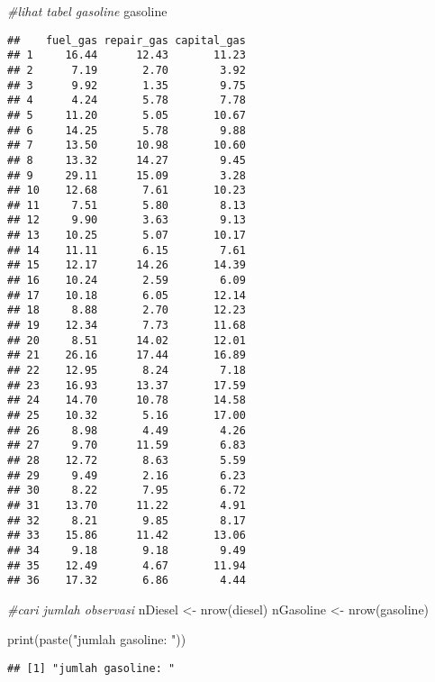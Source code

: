\documentclass[
]{article}
\newenvironment{Shaded}{\begin{snugshade}}{\end{snugshade}}
\newcommand{\CommentTok}[1]{\textcolor[rgb]{0.56,0.35,0.01}{\textit{#1}}}
\newcommand{\FunctionTok}[1]{\textcolor[rgb]{0.00,0.00,0.00}{#1}}
\newcommand{\NormalTok}[1]{#1}
\newcommand{\OtherTok}[1]{\textcolor[rgb]{0.56,0.35,0.01}{#1}}
\newcommand{\StringTok}[1]{\textcolor[rgb]{0.31,0.60,0.02}{#1}}
\begin{document}
\begin{Shaded}
\begin{Highlighting}[]
\CommentTok{\#lihat tabel gasoline}
\NormalTok{gasoline}
\end{Highlighting}
\end{Shaded}

\begin{verbatim}
##    fuel_gas repair_gas capital_gas
## 1     16.44      12.43       11.23
## 2      7.19       2.70        3.92
## 3      9.92       1.35        9.75
## 4      4.24       5.78        7.78
## 5     11.20       5.05       10.67
## 6     14.25       5.78        9.88
## 7     13.50      10.98       10.60
## 8     13.32      14.27        9.45
## 9     29.11      15.09        3.28
## 10    12.68       7.61       10.23
## 11     7.51       5.80        8.13
## 12     9.90       3.63        9.13
## 13    10.25       5.07       10.17
## 14    11.11       6.15        7.61
## 15    12.17      14.26       14.39
## 16    10.24       2.59        6.09
## 17    10.18       6.05       12.14
## 18     8.88       2.70       12.23
## 19    12.34       7.73       11.68
## 20     8.51      14.02       12.01
## 21    26.16      17.44       16.89
## 22    12.95       8.24        7.18
## 23    16.93      13.37       17.59
## 24    14.70      10.78       14.58
## 25    10.32       5.16       17.00
## 26     8.98       4.49        4.26
## 27     9.70      11.59        6.83
## 28    12.72       8.63        5.59
## 29     9.49       2.16        6.23
## 30     8.22       7.95        6.72
## 31    13.70      11.22        4.91
## 32     8.21       9.85        8.17
## 33    15.86      11.42       13.06
## 34     9.18       9.18        9.49
## 35    12.49       4.67       11.94
## 36    17.32       6.86        4.44
\end{verbatim}

\begin{Shaded}
\begin{Highlighting}[]
\CommentTok{\#cari jumlah observasi}
\NormalTok{nDiesel }\OtherTok{\textless{}{-}} \FunctionTok{nrow}\NormalTok{(diesel)}
\NormalTok{nGasoline }\OtherTok{\textless{}{-}} \FunctionTok{nrow}\NormalTok{(gasoline)}

\FunctionTok{print}\NormalTok{(}\FunctionTok{paste}\NormalTok{(}\StringTok{"jumlah gasoline: "}\NormalTok{))}
\end{Highlighting}
\end{Shaded}

\begin{verbatim}
## [1] "jumlah gasoline: "
\end{verbatim}
\end{document}
